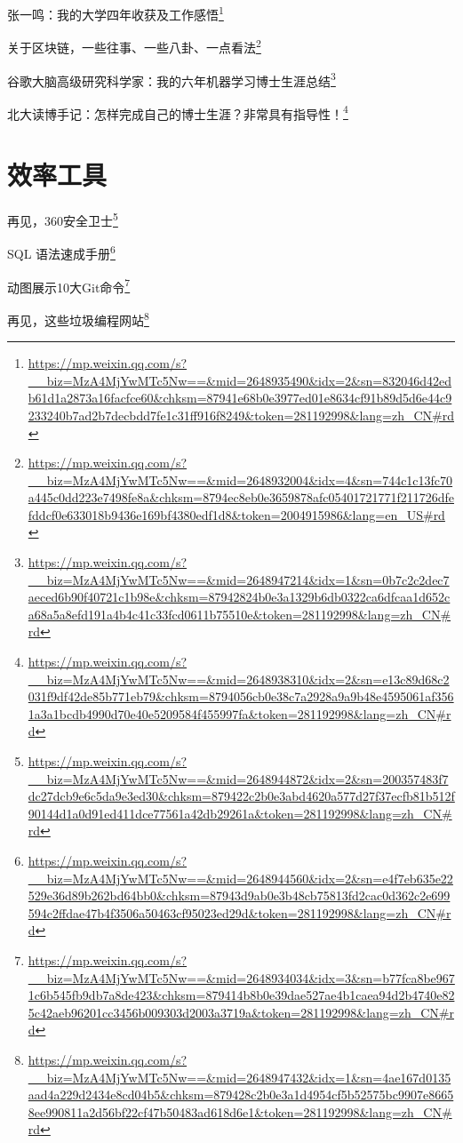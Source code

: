 \documentclass[]{ctexbook}
\renewcommand{\href}[2]{#2\footnote{\url{#1}}}
\begin{document}
\href{https://mp.weixin.qq.com/s?__biz=MzA4MjYwMTc5Nw==\&mid=2648935490\&idx=2\&sn=832046d42edb61d1a2873a16facfce60\&chksm=87941e68b0e3977ed01e8634cf91b89d5d6e44c9233240b7ad2b7decbdd7fe1c31ff916f8249\&token=281192998\&lang=zh_CN\#rd}{张一鸣：我的大学四年收获及工作感悟}

\href{https://mp.weixin.qq.com/s?__biz=MzA4MjYwMTc5Nw==\&mid=2648932004\&idx=4\&sn=744c1c13fc70a445c0dd223e7498fe8a\&chksm=8794ec8eb0e3659878afc05401721771f211726dfefddcf0e633018b9436e169bf4380edf1d8\&token=2004915986\&lang=en_US\#rd}{关于区块链，一些往事、一些八卦、一点看法}

\href{https://mp.weixin.qq.com/s?__biz=MzA4MjYwMTc5Nw==\&mid=2648947214\&idx=1\&sn=0b7c2c2dec7aeced6b90f40721c1b98e\&chksm=87942824b0e3a1329b6db0322ca6dfcaa1d652ca68a5a8efd191a4b4c41c33fcd0611b75510e\&token=281192998\&lang=zh_CN\#rd}{谷歌大脑高级研究科学家：我的六年机器学习博士生涯总结}

\href{https://mp.weixin.qq.com/s?__biz=MzA4MjYwMTc5Nw==\&mid=2648938310\&idx=2\&sn=e13c89d68c2031f9df42de85b771eb79\&chksm=8794056cb0e38c7a2928a9a9b48e4595061af3561a3a1bcdb4990d70e40e5209584f455997fa\&token=281192998\&lang=zh_CN\#rd}{北大读博手记：怎样完成自己的博士生涯？非常具有指导性！}

\hypertarget{ux6548ux7387ux5de5ux5177}{%
\section{效率工具}\label{ux6548ux7387ux5de5ux5177}}

\href{https://mp.weixin.qq.com/s?__biz=MzA4MjYwMTc5Nw==\&mid=2648944872\&idx=2\&sn=200357483f7dc27dcb9e6c5da9e3ed30\&chksm=879422c2b0e3abd4620a577d27f37ecfb81b512f90144d1a0d91ed411dce77561a42db29261a\&token=281192998\&lang=zh_CN\#rd}{​再见，360安全卫士}

\href{https://mp.weixin.qq.com/s?__biz=MzA4MjYwMTc5Nw==\&mid=2648944560\&idx=2\&sn=e4f7eb635e22529e36d89b262bd64bb0\&chksm=87943d9ab0e3b48cb75813fd2cac0d362c2e699594c2ffdae47b4f3506a50463cf95023ed29d\&token=281192998\&lang=zh_CN\#rd}{SQL 语法速成手册}

\href{https://mp.weixin.qq.com/s?__biz=MzA4MjYwMTc5Nw==\&mid=2648934034\&idx=3\&sn=b77fca8be9671c6b545fb9db7a8de423\&chksm=879414b8b0e39dae527ae4b1caea94d2b4740e825c42aeb96201cc3456b009303d2003a3719a\&token=281192998\&lang=zh_CN\#rd}{动图展示10大Git命令}

\href{https://mp.weixin.qq.com/s?__biz=MzA4MjYwMTc5Nw==\&mid=2648947432\&idx=1\&sn=4ae167d0135aad4a229d2434e8cd04b5\&chksm=879428c2b0e3a1d4954cf5b52575bc9907e86658ee990811a2d56bf22cf47b50483ad618d6e1\&token=281192998\&lang=zh_CN\#rd}{再见，这些垃圾编程网站}
\end{document}
